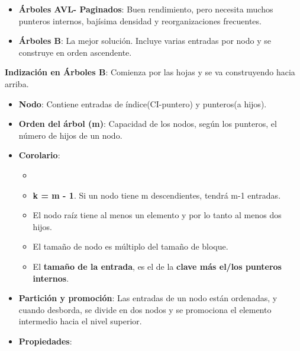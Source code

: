 \documentclass[12pt, twoside, openright]{report} %
\begin{document}
\begin{itemize}
\begin{itemize}
\begin{itemize}
      \item \textbf{Árboles AVL- Paginados}: Buen rendimiento, pero necesita
        muchos punteros internos, bajísima densidad y reorganizaciones
        frecuentes.
        
      \item \textbf{Árboles B}: La mejor solución. Incluye varias entradas
        por nodo y se construye en orden ascendente.
        
      \end{itemize}
    \end{itemize}
  \end{itemize}

  
  \textbf{Indización en Árboles B}: Comienza por las hojas y se va
  construyendo hacia arriba.
  

  \begin{itemize}
  \item \textbf{Nodo}: Contiene entradas de índice(CI-puntero) y punteros(a
    hijos).
    
  \item \textbf{Orden del árbol (m)}: Capacidad de los nodos, según los
    punteros, el número de hijos de un nodo.
    
  \item \textbf{Corolario}:
    

    \begin{itemize}
    \item
    \item \textbf{k = m - 1}. Si un nodo tiene m descendientes, tendrá m-1
      entradas.
      
    \item El nodo raíz tiene al menos un elemento y por lo tanto al menos
      dos hijos.
      
    \item El tamaño de nodo es múltiplo del tamaño de bloque.
      
    \item El \textbf{tamaño de la entrada}, es el de la \textbf{clave más
      el/los punteros internos}.
      
    \end{itemize}
  \item \textbf{Partición y promoción}: Las entradas de un nodo están
    ordenadas, y cuando desborda, se divide en dos nodos y se promociona
    el elemento intermedio hacia el nivel superior.
    \pagebreak
  \item \textbf{Propiedades}:
    


\end{itemize}
\end{document}
